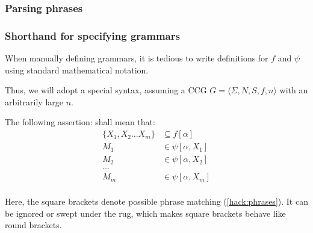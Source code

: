 \documentclass[main.tex]{subfiles}
\begin{document}
\subsubsection{Parsing phrases}

\subsubsection{Shorthand for specifying grammars}
\label{shorthand}
When manually defining grammars, it is tedious to write definitions
for $f$ and $\psi$ using standard mathematical notation.

Thus, we will adopt a special syntax, assuming a CCG
$G = \langle \Sigma, N, S, f, n \rangle$ with an arbitrarily large $n$.

The following assertion:
shall mean that:
\begin{align*}
    \{ X_1, X_2 ... X_m \} & \subseteq f[\alpha] \\
    M_1 & \in \psi[\alpha, X_1] \\
    M_2 & \in \psi[\alpha, X_2] \\
    ... & \\
    M_m & \in \psi[\alpha, X_m] \\
\end{align*}

Here, the square brackets denote possible phrase matching (\cref{hack:phrases}). It can
be ignored or swept under the rug, which makes square brackets behave like
round brackets.
\end{document}
